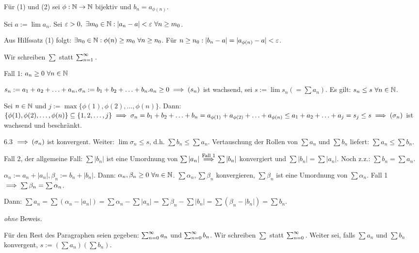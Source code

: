 \documentclass[a4paper,twoside,DIV15,BCOR12mm]{scrbook}
\begin{document}
\begin{beweis}
Für (1) und (2) sei $\phi: \mathbb{N} \to \mathbb{N}$ bijektiv und $b_n=a_{\phi(n)}$.
\begin{liste}
\item Sei $a:=\lim{a_n}$. Sei $\varepsilon>0,\ \exists m_0\in\mathbb{N}: |a_n-a|<\varepsilon\ \forall n \ge m_0$.

Aus Hilfssatz (1) folgt: $\exists n_0\in\mathbb{N}: \phi(n) \ge m_0\ \forall n \ge n_0$. Für $n \ge n_0: |b_n-a| = |a_{\phi(n)}-a| < \varepsilon$.

\item Wir schreiben $\sum$ statt $\sum_{n=1}^{\infty}{}$.

Fall 1: $a_n \ge 0\ \forall n\in\mathbb{N}$

$s_n:=a_1+a_2+\ldots+a_n, \sigma_n:=b_1+b_2+\ldots+b_n. a_n \ge 0 \implies (s_n)$ ist wachsend, sei $s:=\lim{s_n} (=\sum{a_n})$. Es gilt: $s_n \le s\ \forall n\in\mathbb{N}$.

Sei $n\in\mathbb{N}$ und $j:=\max\{\phi(1),\phi(2),\ldots,\phi(n)\}$. Dann: $\{\phi(1),\phi(2),\ldots,\phi(n)\} \subseteq \{1,2,\ldots,j\} \implies \sigma_n=b_1+b_2+\ldots+b_n = a_{\phi(1)}+a_{\phi(2)}+\ldots+a_{\phi(n)} \le a_1+a_2+\ldots+a_j = s_j \le s \implies (\sigma_n)$ ist wachsend und beschränkt.

6.3 $\implies (\sigma_n)$ ist konvergent. Weiter: $\lim{\sigma_n} \le s$, d.h. $\sum{b_n} \le \sum{a_n}$. Vertauschung der Rollen von $\sum{a_n}$ und $\sum{b_n}$ liefert: $\sum{a_n} \le \sum{b_n}$.

Fall 2, der allgemeine Fall: $\sum{|b_n|}$ ist eine Umordnung von $\sum{|a_n|} \overset{\text{Fall 1}}{\implies} \sum{|b_n|}$ konvergiert und $\sum{|b_n|} = \sum{|a_n|}$. Noch z.z.: $\sum{b_n} = \sum{a_n}$.

$\alpha_n := a_n+|a_n|, \beta_n := b_n+|b_n|$. Dann: $\alpha_n,\beta_n \ge 0\ \forall n\in\mathbb{N}$. $\sum{\alpha_n},\sum{\beta_n}$ konvergieren, $\sum{\beta_n}$ ist eine Umordnung von $\sum{\alpha_n}$. Fall 1 $\implies \sum{\beta_n} = \sum{\alpha_n}$.

Dann: $\sum{a_n} = \sum{(\alpha_n-|a_n|)} = \sum{\alpha_n} - \sum{|a_n|} = \sum{\beta_n} - \sum{|b_n|} = \sum{(\beta_n - |b_n|)} = \sum{b_n}$.

\item \emph{ohne} Beweis.
\end{liste}
\end{beweis}

\begin{vereinbarung}
Für den Rest des Paragraphen seien gegeben: $\sum_{n=0}^{\infty}{a_n}$ und $\sum_{n=0}^{\infty}{b_n}$. Wir schreiben $\sum$ statt $\sum_{n=0}^{\infty}{}$. Weiter sei, falls $\sum{a_n}$ und $\sum{b_n}$ konvergent, $s := (\sum{a_n})(\sum{b_n})$.
\end{vereinbarung}
\end{document}
